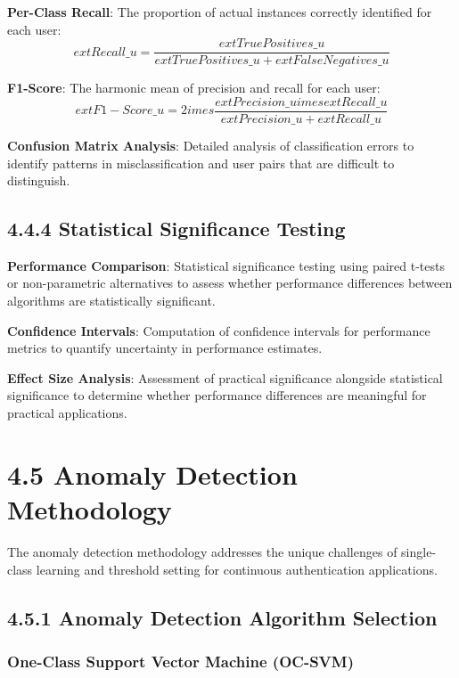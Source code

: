 \documentclass[
  12pt,
  a4paper,
]{report}
\begin{document}
\textbf{Per-Class Recall}: The proportion of actual instances correctly
identified for each user:
\[ ext{Recall}\_u = \frac{ ext{True Positives}\_u}{ ext{True Positives}\_u + ext{False Negatives}\_u}\]

\textbf{F1-Score}: The harmonic mean of precision and recall for each
user:
\[ ext{F1-Score}\_u = 2 imes \frac{ ext{Precision}\_u imes ext{Recall}\_u}{ ext{Precision}\_u + ext{Recall}\_u}\]

\textbf{Confusion Matrix Analysis}: Detailed analysis of classification
errors to identify patterns in misclassification and user pairs that are
difficult to distinguish.

\subsection{4.4.4 Statistical Significance
Testing}\label{statistical-significance-testing}

\textbf{Performance Comparison}: Statistical significance testing using
paired t-tests or non-parametric alternatives to assess whether
performance differences between algorithms are statistically
significant.

\textbf{Confidence Intervals}: Computation of confidence intervals for
performance metrics to quantify uncertainty in performance estimates.

\textbf{Effect Size Analysis}: Assessment of practical significance
alongside statistical significance to determine whether performance
differences are meaningful for practical applications.

\section{4.5 Anomaly Detection
Methodology}\label{anomaly-detection-methodology}

The anomaly detection methodology addresses the unique challenges of
single-class learning and threshold setting for continuous
authentication applications.

\subsection{4.5.1 Anomaly Detection Algorithm
Selection}\label{anomaly-detection-algorithm-selection}

\subsubsection{One-Class Support Vector Machine
(OC-SVM)}\label{one-class-support-vector-machine-oc-svm}
\end{document}
